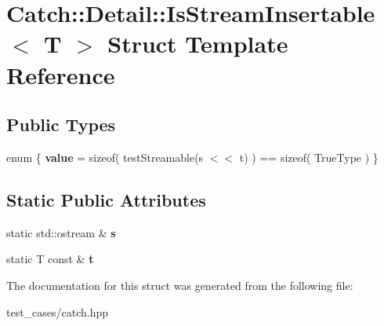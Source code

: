 \hypertarget{structCatch_1_1Detail_1_1IsStreamInsertable}{}\section{Catch\+:\+:Detail\+:\+:Is\+Stream\+Insertable$<$ T $>$ Struct Template Reference}
\label{structCatch_1_1Detail_1_1IsStreamInsertable}
\subsection*{Public Types}
\begin{DoxyCompactItemize}
\item 
\mbox{\label{structCatch_1_1Detail_1_1IsStreamInsertable_a2e4508694da3bf368ff67733a7970edd}} 
enum \{ {\bfseries value} = sizeof( test\+Streamable(s $<$$<$ t) ) == sizeof( True\+Type )
 \}
\end{DoxyCompactItemize}
\subsection*{Static Public Attributes}
\begin{DoxyCompactItemize}
\item 
\mbox{\label{structCatch_1_1Detail_1_1IsStreamInsertable_abe3d3c8e5d85665747faafffc9a96b00}} 
static std\+::ostream \& {\bfseries s}
\item 
\mbox{\label{structCatch_1_1Detail_1_1IsStreamInsertable_a7d2a3da978b6736667a7b2f6d51f507f}} 
static T const  \& {\bfseries t}
\end{DoxyCompactItemize}


The documentation for this struct was generated from the following file\+:\begin{DoxyCompactItemize}
\item 
test\+\_\+cases/catch.\+hpp\end{DoxyCompactItemize}

